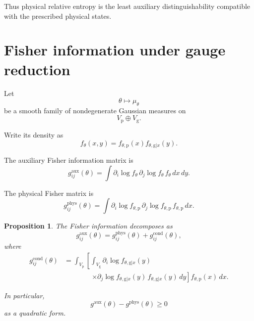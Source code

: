 \documentclass[11pt]{article}
\newtheorem{proposition}[theorem]{Proposition}
\theoremstyle{remark}
\begin{document}
Thus physical relative entropy is the least auxiliary
distinguishability compatible with the prescribed physical
states.

\section{Fisher information under gauge reduction}

Let
\begin{equation}
\theta
\longmapsto
\mu_\theta
\end{equation}
be a smooth family of nondegenerate Gaussian measures on
\begin{equation}
V_{\mathrm p}\oplus V_{\mathrm g}.
\end{equation}

Write its density as
\begin{equation}
f_\theta(x,y)
=
f_{\theta,\mathrm p}(x)
f_{\theta,\mathrm g|x}(y).
\label{eq:family-factorization}
\end{equation}

The auxiliary Fisher information matrix is
\begin{equation}
g^{\mathrm{aux}}_{ij}(\theta)
=
\int
\partial_i\log f_\theta
\,
\partial_j\log f_\theta
\,
f_\theta
\,dx\,dy.
\label{eq:aux-fisher}
\end{equation}

The physical Fisher matrix is
\begin{equation}
g^{\mathrm{phys}}_{ij}(\theta)
=
\int
\partial_i\log f_{\theta,\mathrm p}
\,
\partial_j\log f_{\theta,\mathrm p}
\,
f_{\theta,\mathrm p}
\,dx.
\label{eq:phys-fisher}
\end{equation}

\begin{proposition}
\label{prop:fisher}
The Fisher information decomposes as
\begin{equation}
g^{\mathrm{aux}}_{ij}(\theta)
=
g^{\mathrm{phys}}_{ij}(\theta)
+
g^{\mathrm{cond}}_{ij}(\theta),
\label{eq:fisher-decomposition}
\end{equation}
where
\begin{align}
g^{\mathrm{cond}}_{ij}(\theta)
&=
\int_{V_{\mathrm p}}
\left[
\int_{V_{\mathrm g}}
\partial_i
\log f_{\theta,\mathrm g|x}(y)
\right.
\nonumber\\
&\hspace{4em}
\left.
\times
\partial_j
\log f_{\theta,\mathrm g|x}(y)
\,
f_{\theta,\mathrm g|x}(y)
\,dy
\right]
f_{\theta,\mathrm p}(x)
\,dx.
\label{eq:conditional-fisher}
\end{align}

In particular,
\begin{equation}
g^{\mathrm{aux}}(\theta)
-
g^{\mathrm{phys}}(\theta)
\geq0
\label{eq:fisher-positive}
\end{equation}
as a quadratic form.
\end{proposition}
\end{document}
